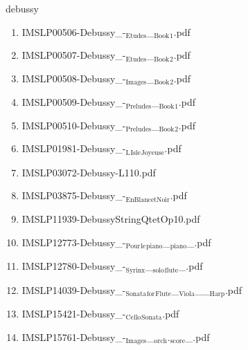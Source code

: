 \documentclass[11pt]{article}
\begin{document}
\item debussy
\label{sec-1-1-1-1-44-23}
\begin{enumerate}
\item IMSLP00506-Debussy\_-$_{\text{Etudes}}$\_$_{\text{Book}}$$_{\text{1}}$.pdf
\label{sec-1-1-1-1-44-23-1}

\item IMSLP00507-Debussy\_-$_{\text{Etudes}}$\_$_{\text{Book}}$$_{\text{2}}$.pdf
\label{sec-1-1-1-1-44-23-2}

\item IMSLP00508-Debussy\_-$_{\text{Images}}$\_$_{\text{Book}}$$_{\text{2}}$.pdf
\label{sec-1-1-1-1-44-23-3}

\item IMSLP00509-Debussy\_-$_{\text{Preludes}}$\_$_{\text{Book}}$$_{\text{1}}$.pdf
\label{sec-1-1-1-1-44-23-4}

\item IMSLP00510-Debussy\_-$_{\text{Preludes}}$\_$_{\text{Book}}$$_{\text{2}}$.pdf
\label{sec-1-1-1-1-44-23-5}

\item IMSLP01981-Debussy\_-$_{\text{L}}$$_{\text{Isle}}$$_{\text{Joyeuse}}$.pdf
\label{sec-1-1-1-1-44-23-6}

\item IMSLP03072-Debussy-L110.pdf
\label{sec-1-1-1-1-44-23-7}

\item IMSLP03875-Debussy\_-$_{\text{EnBlancetNoir}}$.pdf
\label{sec-1-1-1-1-44-23-8}

\item IMSLP11939-DebussyStringQtetOp10.pdf
\label{sec-1-1-1-1-44-23-9}

\item IMSLP12773-Debussy\_-$_{\text{Pour}}$$_{\text{le}}$$_{\text{piano}}$\_$_{\text{piano}}$\_.pdf
\label{sec-1-1-1-1-44-23-10}

\item IMSLP12780-Debussy\_-$_{\text{Syrinx}}$\_$_{\text{solo}}$$_{\text{flute}}$\_.pdf
\label{sec-1-1-1-1-44-23-11}

\item IMSLP14039-Debussy\_-$_{\text{Sonata}}$$_{\text{for}}$$_{\text{Flute}}$\_$_{\text{Viola}}$\_\_$_{\text{Harp}}$.pdf
\label{sec-1-1-1-1-44-23-12}

\item IMSLP15421-Debussy\_-$_{\text{Cello}}$$_{\text{Sonata}}$.pdf
\label{sec-1-1-1-1-44-23-13}

\item IMSLP15761-Debussy\_-$_{\text{Images}}$\_$_{\text{orch}}$.$_{\text{score}}$\_.pdf
\label{sec-1-1-1-1-44-23-14}


\end{enumerate}
\end{document}
